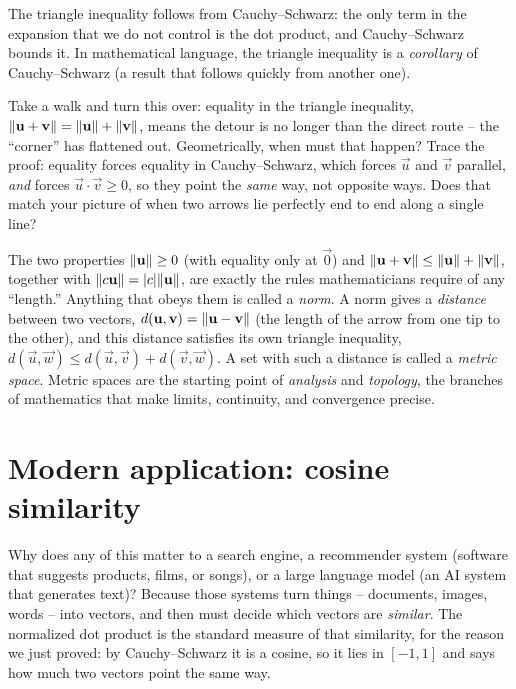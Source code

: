 The triangle inequality follows from Cauchy--Schwarz: the only term in the expansion
that we do not control is the dot product, and Cauchy--Schwarz bounds it. In
mathematical language, the triangle inequality is a \emph{corollary} of
Cauchy--Schwarz (a result that follows quickly from another one).

\begin{walkbox}
Take a walk and turn this over: equality in the triangle inequality,
$\lVert\mathbf{u}+\mathbf{v}\rVert=\lVert\mathbf{u}\rVert+\lVert\mathbf{v}\rVert$, means the detour is no longer than
the direct route -- the ``corner'' has flattened out. Geometrically, when must that
happen? Trace the proof: equality forces equality in Cauchy--Schwarz, which forces
$\vec u$ and $\vec v$ parallel, \emph{and} forces $\vec u\cdot\vec v\ge 0$, so they
point the \emph{same} way, not opposite ways. Does that match your picture of when
two arrows lie perfectly end to end along a single line?
\end{walkbox}

\begin{connectionbox}
The two properties $\lVert\mathbf{u}\rVert\ge 0$ (with equality only at $\vec 0$) and
$\lVert\mathbf{u}+\mathbf{v}\rVert\le\lVert\mathbf{u}\rVert+\lVert\mathbf{v}\rVert$, together with
$\lVert c\mathbf{u}\rVert=\lvert c\rvert\lVert\mathbf{u}\rVert$, are exactly the rules mathematicians require of
any ``length.'' Anything that obeys them is called a \emph{norm}. A norm gives a
\emph{distance} between two vectors, $d(\mathbf{u},\mathbf{v}) = \lVert\mathbf{u}-\mathbf{v}\rVert$ (the
length of the arrow from one tip to the other), and this distance satisfies its own
triangle inequality, $d(\vec u,\vec w)\le d(\vec u,\vec v)+d(\vec v,\vec w)$. A set
with such a distance is called a \emph{metric space}. Metric spaces are the starting
point of \emph{analysis} and \emph{topology}, the branches of mathematics that make
limits, continuity, and convergence precise.
\end{connectionbox}

\section{Modern application: cosine similarity}

Why does any of this matter to a search engine, a recommender system (software that
suggests products, films, or songs), or a large language model (an AI system that
generates text)? Because those systems turn things -- documents, images, words --
into vectors, and then must decide which vectors are \emph{similar}. The normalized
dot product is the standard measure of that similarity, for the reason we just
proved: by Cauchy--Schwarz it is a cosine, so it lies in $[-1,1]$ and says how much
two vectors point the same way.


